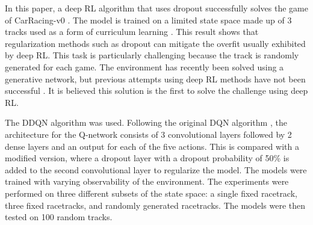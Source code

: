 \documentclass{article}
\begin{document}
In this paper, a deep RL algorithm that uses dropout
\cite{Dropout} successfully solves the game of
CarRacing-v0 \cite{CarRacing}. The model is trained on a
limited state space made up of 3 tracks used as a form of curriculum
learning \cite{bengio2009curriculum}. This result shows that
regularization methods such as dropout can mitigate the overfit
usually exhibited by deep RL. This task is particularly challenging
because the track is randomly generated for each game. The environment
has recently been solved using a generative network, but previous
attempts using deep RL methods have not been successful
\cite{World_Models,CarRacing1}. It is believed this solution is
the first to solve the challenge using deep RL.  

The DDQN algorithm \cite{DQN,DDQN} was used.
Following the original DQN algorithm \cite{DQN}, the architecture
for the Q-network consists of 3 convolutional layers followed by 2
dense layers and an output for each of the five actions.
This is compared with a modified version, where a dropout layer with a 
dropout probability of 50\% is
added to the second convolutional layer to regularize the model.  
The models were trained with varying observability of the
environment. The experiments were performed on three different subsets of
the state space: a single fixed racetrack, three fixed racetracks, and 
randomly generated racetracks. The models were then tested on 100
random tracks.
\end{document}
